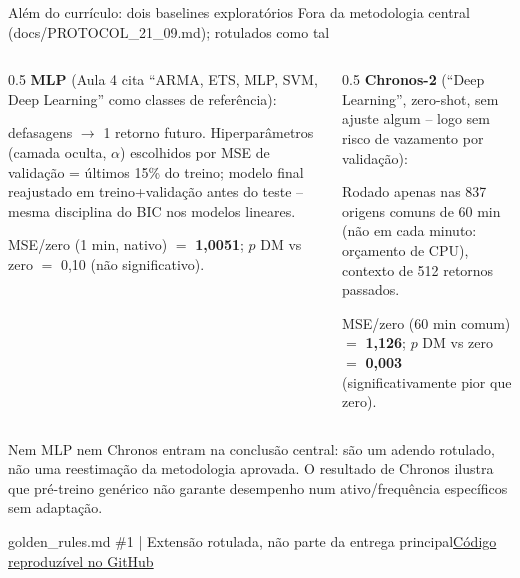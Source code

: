 \documentclass[aspectratio=169,10pt]{beamer}
\newcommand{\source}[2]{\par\vfill{\raggedright\tiny\color{muted}#1\quad\href{#2}{Código reproduzível no GitHub}\par}}
\newcommand{\tagline}[1]{{\small\color{teal}#1}\par\medskip}
\begin{document}
\begin{frame}[t]{Além do currículo: dois baselines exploratórios}
\tagline{Fora da metodologia central (docs/PROTOCOL\_21\_09.md); rotulados como tal}
\begin{columns}[T]\begin{column}{0.5\textwidth}\small
\textbf{MLP} (Aula 4 cita ``ARMA, ETS, MLP, SVM, Deep Learning'' como classes de referência):\par{} defasagens $\to$ 1 retorno futuro. Hiperparâmetros (camada oculta, $\alpha$) escolhidos por MSE de validação = últimos 15\% do treino; \alert{modelo final reajustado em treino+validação} antes do teste -- mesma disciplina do BIC nos modelos lineares.\par\smallskip
MSE/zero (1 min, nativo) $=$ \textbf{1,0051}; $p$ DM vs zero $=$ 0,10 (não significativo).
\end{column}\begin{column}{0.5\textwidth}\small
\textbf{Chronos-2} (``Deep Learning'', zero-shot, sem ajuste algum -- logo sem risco de vazamento por validação):\par\smallskip
Rodado apenas nas 837 origens comuns de 60 min (não em cada minuto: orçamento de CPU), contexto de 512 retornos passados.\par\smallskip
MSE/zero (60 min comum) $=$ \textbf{1,126}; $p$ DM vs zero $=$ \textbf{0,003} (\alert{significativamente pior} que zero).
\end{column}\end{columns}\par\medskip
\scriptsize Nem MLP nem Chronos entram na conclusão central: são um adendo rotulado, não uma reestimação da metodologia aprovada. O resultado de Chronos ilustra que pré-treino genérico não garante desempenho num ativo/frequência específicos sem adaptação.
\source{golden\_rules.md \#1 | Extensão rotulada, não parte da entrega principal}{https://github.com/avilarenan/EAD6034/blob/main/src/ead6034/neural_baselines.py}
\end{frame}
\end{document}

